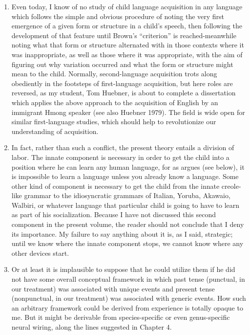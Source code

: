 \begin{enumerate}
\item Even today, I know of no study of child language acquisition in any language which follows the simple and obvious procedure of noting the very first emergence of a given form or structure in a child's speech, then following the development of that feature until Brown's ``criterion'' is reached-meanwhile noting what that form or structure alternated with in those contexts where it was inappropriate, as well as those where it was appropriate, with the aim of figuring out why variation occurred and what the form or structure might mean to the child. Normally, second-language acquisition trots along obediently in the footsteps of first-language acquisition, but here roles are reversed, as my student, Tom Huebner, is about to complete a dissertation which applies the above approach to the acquisition of English by an immi\-grant Hmong speaker (see also Huebner 1979). The field is wide open for similar first-language studies, which should help to revolutionize our understanding of acquisition.
\item In fact, rather than such a conflict, the present theory entails a division of labor. The innate component is necessary in order to get the child into a position where he can learn any human language, for as \citet{Fodor1975} argues (see below), it is impossible to learn a language unless you already know a language. Some other kind of component is necessary to get the child from the innate creole-like grammar to the idiosyncratic grammars of Italian, Yoruba, Akawaio, Walbiri, or what\-ever language that particular child is going to have to learn as part of his socialization. Because I have not discussed this second component in the present volume, the reader should not conclude that I deny its 
importance. My failure to say anything about it is, as I said, strategic; until we know where the innate component stops, we cannot know where any other devices start.
\item Or at least it is implausible to suppose that he could utilize them if he did not have some overall conceptual framework in which past tense (punctual, in our treatment) was associated with unique events and present tense (nonpunctual, in our treatment) was associ\-ated with generic events. How such an arbitrary framework could be derived from experience is totally opaque to me. But it might be derivable from species-specific or even genus-specific neural wiring, along the lines suggested in Chapter 4.

\end{enumerate}
